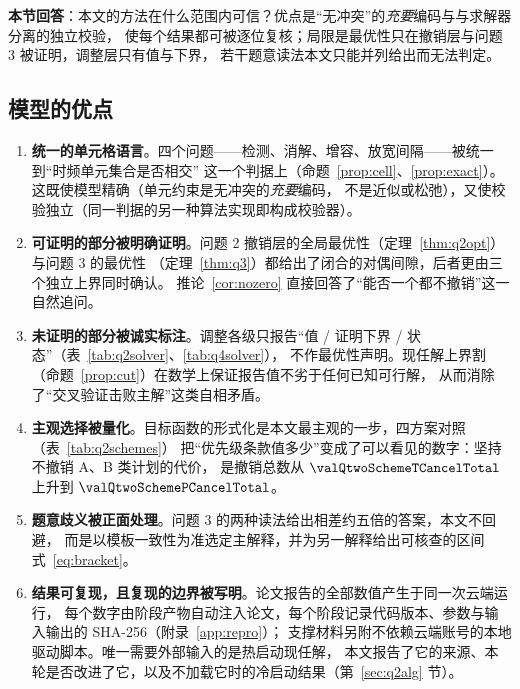 \label{sec:eval}

\noindent\textbf{本节回答}：本文的方法在什么范围内可信？优点是“无冲突”的\emph{充要}编码与与求解器分离的独立校验，
使每个结果都可被逐位复核；局限是最优性只在撤销层与问题 3 被证明，调整层只有值与下界，
若干题意读法本文只能并列给出而无法判定。

\subsection{模型的优点}

\begin{enumerate}[leftmargin=1.8em,itemsep=0.25em]
  \item \textbf{统一的单元格语言}。四个问题——检测、消解、增容、放宽间隔——被统一到“时频单元集合是否相交”
        这一个判据上（命题~\ref{prop:cell}、\ref{prop:exact}）。这既使模型精确（单元约束是无冲突的\emph{充要}编码，
        不是近似或松弛），又使校验独立（同一判据的另一种算法实现即构成校验器）。
  \item \textbf{可证明的部分被明确证明}。问题 2 撤销层的全局最优性（定理~\ref{thm:q2opt}）与问题 3 的最优性
        （定理~\ref{thm:q3}）都给出了闭合的对偶间隙，后者更由三个独立上界同时确认。
        推论~\ref{cor:nozero} 直接回答了“能否一个都不撤销”这一自然追问。
  \item \textbf{未证明的部分被诚实标注}。调整各级只报告“值 / 证明下界 / 状态”（表~\ref{tab:q2solver}、\ref{tab:q4solver}），
        不作最优性声明。现任解上界割（命题~\ref{prop:cut}）在数学上保证报告值不劣于任何已知可行解，
        从而消除了“交叉验证击败主解”这类自相矛盾。
  \item \textbf{主观选择被量化}。目标函数的形式化是本文最主观的一步，四方案对照（表~\ref{tab:q2schemes}）
        把“优先级条款值多少”变成了可以看见的数字：坚持不撤销 A、B 类计划的代价，
        是撤销总数从 $\valQtwoSchemeTCancelTotal$ 上升到 $\valQtwoSchemePCancelTotal$。
  \item \textbf{题意歧义被正面处理}。问题 3 的两种读法给出相差约五倍的答案，本文不回避，
        而是以模板一致性为准选定主解释，并为另一解释给出可核查的区间式~\eqref{eq:bracket}。
  \item \textbf{结果可复现，且复现的边界被写明}。论文报告的全部数值产生于同一次云端运行，
        每个数字由阶段产物自动注入论文，每个阶段记录代码版本、参数与输入输出的 SHA-256（附录~\ref{app:repro}）；
        支撑材料另附不依赖云端账号的本地驱动脚本。唯一需要外部输入的是热启动现任解，
        本文报告了它的来源、本轮是否改进了它，以及不加载它时的冷启动结果（第~\ref{sec:q2alg} 节）。
\end{enumerate}

